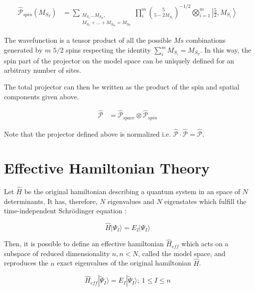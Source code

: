 \documentclass[12pt,twoside]{report}
\begin{document}
	\begin{equation}
		\begin{split}
			\hat{\mathcal{P}}_{spin}(M_{S_T}) & = \sum_{\substack{M_{S_1}\dots M_{S_m},\\ M_{S_1} + \dots + M_{S_m} = M_{S_T}}} \prod_{i}^{m}
			\binom{5}{5 - 2 M_{S_i}}^{-1/2}
			\bigotimes_{i = 1}^{m}\left|\frac{5}{2},M_{S_i}\right\rangle
		\end{split}
		\label{eq:demodel}
	\end{equation}

    The wavefunction is a tensor product of all the possible $Ms$ combinations
	generated by $m$ $5 \slash 2$ spins respecting the identity
	$\sum_i^m M_{S_i} = M_{S_T}$.  In this way, the spin part of the projector on the
	model space can be uniquely defined for an arbitrary number of sites.

	The total projector can then be written as the product of the spin
	and spatial components given above.

	\begin{equation}
		\begin{split}
			\hat{\mathcal{P}} & = \hat{\mathcal{P}}_{space}\otimes\hat{\mathcal{P}}_{spin}
		\end{split}
		\label{eq:demodel}
	\end{equation}

	Note that the projector defined above is normalized i.e.
	$\hat{\mathcal{P}}\cdot\hat{\mathcal{P}} = \hat{\mathcal{P}}$.

	\section{Effective Hamiltonian Theory}

	Let $\hat{H}$ be the original hamiltonian describing a quantum system in
	an space of $N$ determinants, It has, therefore, $N$ eigenvalues and $N$
	eigenstates which fulfill the time-independent Schrödinger equation :

	\begin{equation}
	    \hat{H} |\Psi_I\rangle=E_I|\Psi_I\rangle
	\end{equation}

	Then, it is possible to define an effective hamiltonian $\hat{H}_{eff}$ which
	acts on a subspace of reduced dimensionality $n, n<N$, called the model space,
	and reproduces the $n$ exact eigenvalues of the original hamiltonian
	$\hat{H}$.

	\begin{equation}
	    \hat{H}_{eff} |\tilde{\Psi}_I\rangle=E_I|\tilde{\Psi}_I\rangle;\ 1 \le I \le n
	\end{equation}
\end{document}
